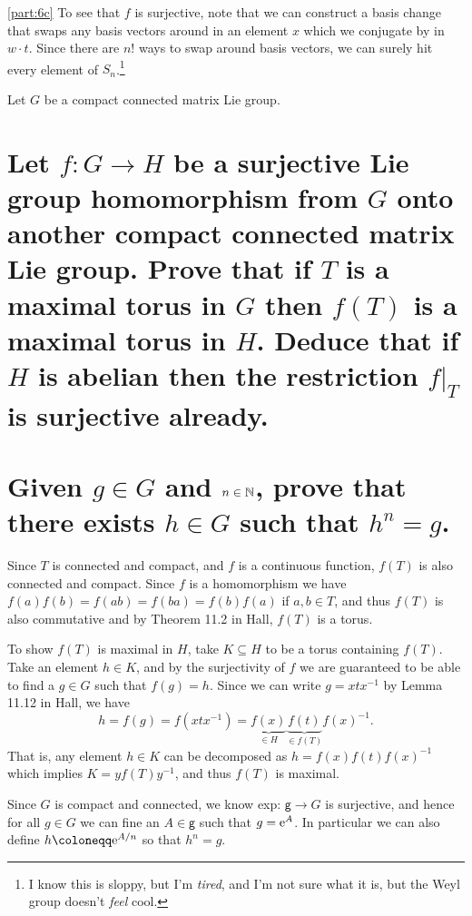 \documentclass[
	pages,
	boxes,
	color=WildStrawberry
]{homework}
\begin{document}
\begin{solution}
	\ref{part:6c}
	To see that $f$ is surjective, note that we can construct a basis change that swaps any basis vectors around in an element $x$ which we conjugate by in $w\cdot t$. Since there are $n!$ ways to swap around basis vectors, we can surely hit every element of $S_n$.\footnote{I know this is sloppy, but I'm \emph{tired}, and I'm not sure what it is, but the Weyl group doesn't \emph{feel} cool.}
\end{solution}

\begin{problem}
Let $G$ be a compact connected matrix Lie group.
\begin{parts}
	\part{Let $f: G \to H$ be a surjective Lie group homomorphism from $G$ onto another compact connected matrix Lie group. Prove that if $T$ is a maximal torus in $G$ then $f(T)$ is a maximal torus in $H$. Deduce that if $H$ is abelian then the restriction $f|_{T}$ is surjective already.}\label{part:8a}
	\part{Given $g \in G$ and $n \in \mathbb{N}$, prove that there exists $h \in G$ such that $h^n = g$.}\label{part:8b}
\end{parts}
\end{problem}

\begin{solution}
	\ref{part:8a}
	Since $T$ is connected and compact, and $f$ is a continuous function, $f(T)$ is also connected and compact. Since $f$ is a homomorphism we have $f(a)f(b) = f(ab) = f(ba) = f(b)f(a)$ if $a, b\in T$, and thus $f(T)$ is also commutative and by Theorem 11.2 in Hall, $f(T)$ is a torus.

	To show $f(T)$ is maximal in $H$, take $K\subseteq H$ to be a torus containing $f(T)$. Take an element $h\in K$, and by the surjectivity of $f$ we are guaranteed to be able to find a $g\in G$ such that $f(g) = h$. Since we can write $g = xtx^{-1}$ by Lemma 11.12 in Hall, we have
	\begin{equation*}
		h = f(g) = f(xtx^{-1}) = \underbrace{f(x)}_{\in H}\underbrace{f(t)}_{\in f(T)}f(x)^{-1}.
	\end{equation*}
	That is, any element $h\in K$ can be decomposed as $h = f(x)f(t)f(x)^{-1}$ which implies $K = yf(T)y^{-1}$, and thus $f(T)$ is maximal.

	\ref{part:8b}
	Since $G$ is compact and connected, we know exp: $\mathsf{g}\to G$ is surjective, and hence for all $g\in G$ we can fine an $A\in\mathsf{g}$ such that $g = \mathrm{e}^{A}$. In particular we can also define $h\defeq \e^{A/n}$ so that $h^n = g$.
\end{solution}
\end{document}
